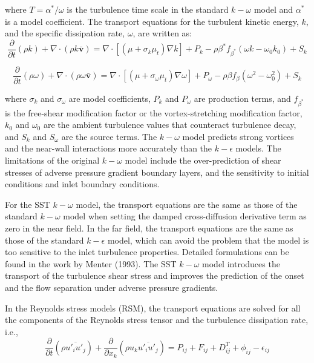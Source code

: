 \documentclass[onecolumn,11pt]{report}
\begin{document}
where $T=\alpha^*/\omega$ is the turbulence time scale in the standard $k-\omega$ model and $\alpha^*$ is a model coefficient. The transport equations for the turbulent kinetic energy, $k$, and the specific dissipation rate, $\omega$, are written as:
\begin{equation}
\frac{\partial}{\partial t} (\rho k) + \nabla \cdot (\rho k \bar{\textbf{v}}) = \nabla \cdot \left[ (\mu + \sigma_k \mu_t) \nabla k \right] + P_k -\rho \beta^*f_{\beta^*}(\omega k - \omega_0 k_0) + S_k
\label{eq11}
\end{equation}

\begin{equation}
\frac{\partial}{\partial t} (\rho \omega) + \nabla \cdot (\rho \omega \bar{\textbf{v}}) = \nabla \cdot \left[ (\mu + \sigma_\omega \mu_t) \nabla \omega \right] + P_\omega -\rho \beta f_{\beta}(\omega^2 - \omega_0^2) + S_k
\label{eq12}
\end{equation}

where $\sigma_k$ and $\sigma_{\omega}$ are model coefficients, $P_k$ and $P_{\omega}$ are production terms, and $f_{\beta^*}$ is the free-shear modification factor or the vortex-stretching modification factor, $k_0$ and $\omega_0$ are the ambient turbulence values that counteract turbulence decay, and $S_k$ and $S_{\omega}$ are the source terms. The $k-\omega$ model predicts strong vortices and the near-wall interactions more accurately than the $k-\epsilon$ models. The limitations of the original $k-\omega$ model include the over-prediction of shear stresses of adverse pressure gradient boundary layers, and the sensitivity to initial conditions and inlet boundary conditions. 

For the SST $k-\omega$ model, the transport equations are the same as those of the standard $k-\omega$ model when setting the damped cross-diffusion derivative term as zero in the near field. In the far field, the transport equations are the same as those of the standard $k-\epsilon$ model, which can avoid the problem that the model is too sensitive to the inlet turbulence properties. Detailed formulations can be found in the work by Menter (1993). The SST $k-\omega$ model introduces the transport of the turbulence shear stress and improves the prediction of the onset and the flow separation under adverse pressure gradients.

In the Reynolds stress models (RSM), the transport equations are solved for all the components of the Reynolds stress tensor and the turbulence dissipation rate, i.e.,
\begin{equation}
\frac{\partial}{\partial t} (\rho \overline{u'_i u'_j}) + \frac{\partial}{\partial x_k} (\rho u_k \overline{u'_i u'_j} ) = P_{ij} + F_{ij} + D_{ij}^T + \phi_{ij} - \epsilon_{ij}
\label{eq13}
\end{equation}
\end{document}
